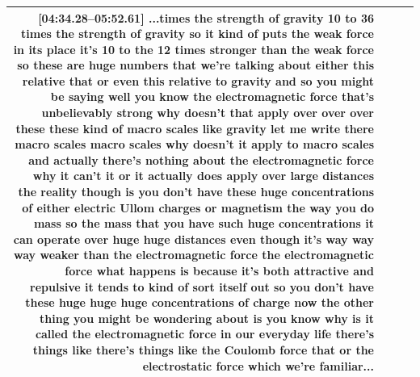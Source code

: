 \documentclass[10pt]{article}
\begin{document}
\begin{tiny}
\begin{longtable}{|r|p{0.375in}|p{1.275in}|p{3.5in}|}
                                                                                                                                                                                                                                                                                                                                                                                                                                                                                   \textbf{[04:34.28--05:52.61]} ...times the strength of gravity 10 to 36 times the strength of gravity so it kind of puts the weak force in its place it's 10 to the 12 times stronger than the weak force so these are huge numbers that we're talking about either this relative that or even this relative to gravity and so you might be saying well you know the electromagnetic force that's unbelievably strong why doesn't that apply over over over these these kind of macro scales like gravity let me write there macro scales macro scales why doesn't it apply to macro scales and actually there's nothing about the electromagnetic force why it can't it or it actually does apply over large distances the reality though is you don't have these huge concentrations of either electric Ullom charges or magnetism the way you do mass so the mass that you have such huge concentrations it can operate over huge huge distances even though it's way way way weaker than the electromagnetic force the electromagnetic force what happens is because it's both attractive and repulsive it tends to kind of sort itself out so you don't have these huge huge huge concentrations of charge now the other thing you might be wondering about is you know why is it called the electromagnetic force in our everyday life there's things like there's things like the Coulomb force that or the electrostatic force which we're familiar... \\\hline

\end{longtable}
\end{tiny}
\end{document}
